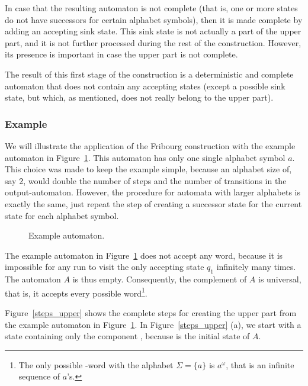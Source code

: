In case that the resulting automaton is not complete (that is, one or more states do not have successors for certain alphabet symbols), then it is made complete by adding an accepting sink state. This sink state is not actually a part of the upper part, and it is not further processed during the rest of the construction. However, its presence is important in case the upper part is not complete. 

The result of this first stage of the construction is a deterministic and complete automaton that does not contain any accepting states (except a possible sink state, but which, as mentioned, does not really belong to the upper part).


\subsubsection{Example}

We will illustrate the application of the Fribourg construction with the example automaton in Figure~\ref{example_automaton}. This automaton has only  one single alphabet symbol $a$. This choice was made to keep the example simple, because an alphabet size of, say 2, would double the number of steps and the number of transitions in the output-automaton. However, the procedure for automata with larger alphabets is exactly the same, just repeat the step of creating a successor state for the current state for each alphabet symbol.

\begin{figure}
\centering
\Automaton
\caption{Example automaton.}
\label{example_automaton}
\end{figure}

The example automaton in Figure~\ref{example_automaton} does not accept any word, because it is impossible for any run to visit the only accepting state $q_1$ infinitely many times. The automaton $A$ is thus empty. Consequently, the complement of $A$ is universal, that is, it accepts every possible word\footnote{The only possible \om-word with the alphabet $\Sigma = \{a\}$ is $a^\omega$, that is an infinite sequence of $a$'s.}.

Figure~\ref{steps_upper} shows the complete steps for creating the upper part from the example automaton in Figure~\ref{example_automaton}. In Figure~\ref{steps_upper} (a), we start with a state containing only the component , because  is the initial state of $A$.

